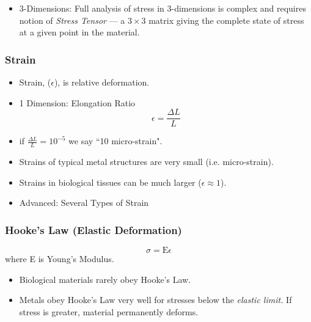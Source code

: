 \begin{itemize}
\item 3-Dimensions:
 Full analysis of stress in 3-dimensions is complex and requires notion of	%
{\it Stress Tensor} --- a $3\times$3 matrix giving
the complete state of stress at a given point in the material.


\end{itemize}




\subsubsection{Strain}

\begin{itemize}

\item  Strain, ($\epsilon$), is relative deformation.

\item 1 Dimension: Elongation Ratio
\[
\epsilon = \frac{\Delta L}{L}
\]

\item if $\frac{\Delta L}{L} = 10^{-5}$ we say ``10 micro-strain".

\item Strains of typical metal structures are very small
 (i.e. micro-strain).

\item Strains in biological tissues can be much larger
($\epsilon \approx 1$).

\item Advanced: Several Types of Strain


\end{itemize}

\subsubsection{Hooke's Law (Elastic Deformation)}
\[
\sigma = \mathrm{E}\epsilon
\]
where E is Young's Modulus.

\begin{itemize}

\item Biological materials rarely obey Hooke's Law.

\item Metals obey Hooke's Law very well for stresses below the
{\it elastic limit.}   If stress is greater, material
permanently deforms.

\end{itemize}

